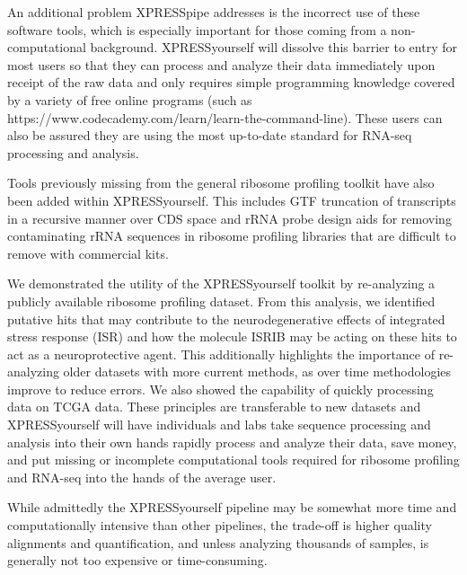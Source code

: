 \documentclass[11pt, a4paper, oneside]{article}
\begin{document}
An additional problem XPRESSpipe addresses is the incorrect use of these software tools, which is especially important  for those coming from a non-computational background. XPRESSyourself will dissolve this barrier to entry for most users so that they can process and analyze their data immediately upon receipt of the raw data and only requires simple programming knowledge covered by a variety of free online programs (such as https://www.codecademy.com/learn/learn-the-command-line). These users can also be assured they are using the most up-to-date standard for RNA-seq processing and analysis. \par

Tools previously missing from the general ribosome profiling toolkit have also been added within XPRESSyourself. This includes GTF truncation of transcripts in a recursive manner over CDS space and rRNA probe design aids for removing contaminating rRNA sequences in ribosome profiling libraries that are difficult to remove with commercial kits. \par

We demonstrated the utility of the XPRESSyourself toolkit by re-analyzing a publicly available ribosome profiling dataset. From this analysis, we identified putative hits that may contribute to the neurodegenerative effects of integrated stress response (ISR) and how the molecule ISRIB may be acting on these hits to act as a neuroprotective agent. This additionally highlights the importance of re-analyzing older datasets with more current methods, as over time methodologies improve to reduce errors. We also showed the capability of quickly processing data on TCGA data. These principles are transferable to new datasets and XPRESSyourself will have individuals and labs take sequence processing and analysis into their own hands rapidly process and analyze their data, save money, and put missing or incomplete computational tools required for ribosome profiling and RNA-seq into the hands of the average user. \par

While admittedly the XPRESSyourself pipeline may be somewhat more time and computationally intensive than other pipelines, the trade-off is higher quality alignments and quantification, and unless analyzing thousands of samples, is generally not too expensive or time-consuming.
\end{document}
